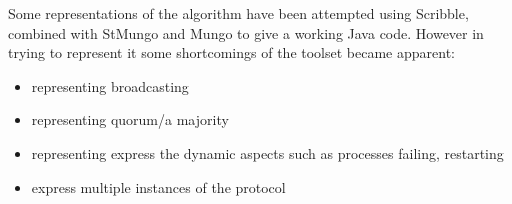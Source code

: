 %
%

%
%
%

Some representations of the algorithm have been attempted using Scribble, combined with StMungo and Mungo to give a working Java code. However in trying to represent it some shortcomings of the toolset became apparent:
\begin{itemize}
  \item representing broadcasting
  \item representing quorum/a majority
  \item representing express the dynamic aspects such as processes failing, restarting
  \item express multiple instances of the protocol
\end{itemize}


